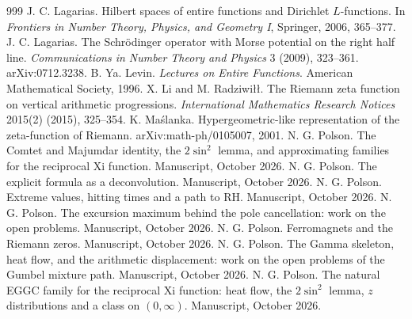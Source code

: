 \begin{thebibliography}{999}
 J. C. Lagarias. Hilbert spaces of entire functions and Dirichlet $L$-functions. In \emph{Frontiers in Number Theory, Physics, and Geometry I}, Springer, 2006, 365--377.
 J. C. Lagarias. The Schr\"odinger operator with Morse potential on the right half line. \emph{Communications in Number Theory and Physics} 3 (2009), 323--361. arXiv:0712.3238.
 B. Ya. Levin. \emph{Lectures on Entire Functions}. American Mathematical Society, 1996.
 X. Li and M. Radziwi\l\l. The Riemann zeta function on vertical arithmetic progressions. \emph{International Mathematics Research Notices} 2015(2) (2015), 325--354.
 K. Ma\'slanka. Hypergeometric-like representation of the zeta-function of Riemann. arXiv:math-ph/0105007, 2001.
 N. G. Polson. The Comtet and Majumdar identity, the $2\sin^2$ lemma, and approximating families for the reciprocal Xi function. Manuscript, October 2026.
 N. G. Polson. The explicit formula as a deconvolution. Manuscript, October 2026.
 N. G. Polson. Extreme values, hitting times and a path to RH. Manuscript, October 2026.
 N. G. Polson. The excursion maximum behind the pole cancellation: work on the open problems. Manuscript, October 2026.
 N. G. Polson. Ferromagnets and the Riemann zeros. Manuscript, October 2026.
 N. G. Polson. The Gamma skeleton, heat flow, and the arithmetic displacement: work on the open problems of the Gumbel mixture path. Manuscript, October 2026.
 N. G. Polson. The natural EGGC family for the reciprocal Xi function: heat flow, the $2\sin^2$ lemma, $z$ distributions and a class on $(0,\infty)$. Manuscript, October 2026.

\end{thebibliography}

